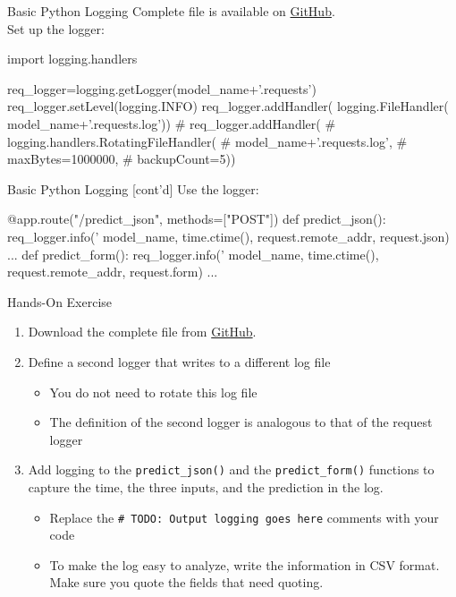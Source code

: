 \documentclass[ignorenonframetext,xcolor=x11names]{beamer}
\begin{document}
\begin{frame}[fragile]{Basic Python Logging}
Complete file is available on \href{https://github.com/jevermann/busi4720-mlops/blob/main/flask_deploy_logging.py}{GitHub}. \\

Set up the logger:
\begin{pythoncode}
import logging.handlers

req_logger=logging.getLogger(model_name+'.requests')
req_logger.setLevel(logging.INFO)
req_logger.addHandler(
    logging.FileHandler(
        model_name+'.requests.log'))
# req_logger.addHandler(
#     logging.handlers.RotatingFileHandler(
#         model_name+'.requests.log',
#         maxBytes=1000000,
#         backupCount=5))
\end{pythoncode}
\end{frame}

\begin{frame}[fragile]{Basic Python Logging \small [cont'd]}
Use the logger:
\begin{pythoncode}
@app.route("/predict_json", methods=["POST"])
def predict_json():
    req_logger.info('%
                    model_name, 
                    time.ctime(), 
                    request.remote_addr, 
                    request.json)
...
def predict_form():
    req_logger.info('%
                    model_name,
                    time.ctime(),
                    request.remote_addr,
                    request.form)
...
\end{pythoncode}
\end{frame}

\begin{frame}{Hands-On Exercise}
\begin{enumerate}
\item Download the complete file from \href{https://github.com/jevermann/busi4720-mlops/blob/main/flask_deploy_logging.py}{GitHub}. \\
\item Define a second logger that writes to a different log file
\begin{itemize}
  \item You do not need to rotate this log file
  \item The definition of the second logger is analogous to that of the request logger
\end{itemize}
\item Add logging to the \texttt{predict\_json()} and the \texttt{predict\_form()} functions to capture the time, the three inputs, and the prediction in the log.
\begin{itemize}
   \item Replace the \texttt{\# TODO: Output logging goes here} comments with your code
   \item To make the log easy to analyze, write the information in CSV format. Make sure you quote the fields that need quoting.
\end{itemize}
\end{enumerate}
\end{frame}
\end{document}
